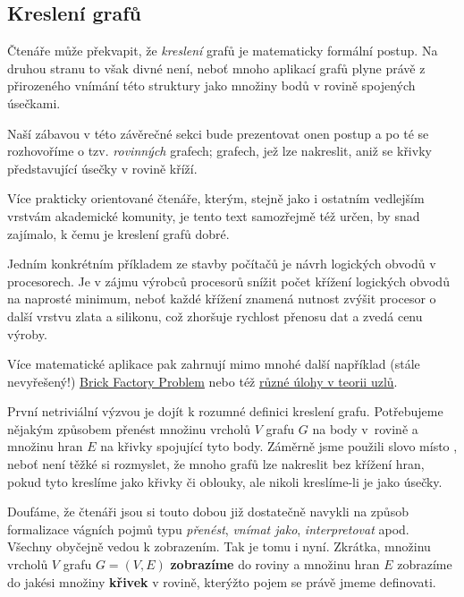 \subsection{Kreslení grafů}
\label{ssec:kresleni-grafu}

Čtenáře může překvapit, že \emph{kreslení} grafů je matematicky formální postup.
Na druhou stranu to však divné není, neboť mnoho aplikací grafů plyne právě z
přirozeného vnímání této struktury jako množiny bodů v rovině spojených
úsečkami.

Naší zábavou v této závěrečné sekci bude prezentovat onen postup a po té se
rozhovoříme o tzv. \emph{rovinných} grafech; grafech, jež lze nakreslit, aniž se
křivky představující úsečky v rovině kříží.

Více prakticky orientované čtenáře, kterým, stejně jako i ostatním vedlejším
vrstvám akademické komunity, je tento text samozřejmě též určen, by snad
zajímalo, k čemu je kreslení grafů dobré.

Jedním konkrétním příkladem ze stavby počítačů je návrh logických obvodů v
procesorech. Je v zájmu výrobců procesorů snížit počet křížení logických obvodů
na naprosté minimum, neboť každé křížení znamená nutnost zvýšit procesor o další
vrstvu zlata a silikonu, což zhoršuje rychlost přenosu dat a zvedá cenu výroby.

Více matematické aplikace pak zahrnují mimo mnohé další například (stá\-le
nevyřešený!)
\href{https://en.wikipedia.org/wiki/Tur%C3%A1n%27s_brick_factory_problem}{Brick
Factory Problem} nebo též
\href{https://www.sciencedirect.com/science/article/abs/pii/S0252960212600472}{různé
úlohy v teorii uzlů}.

První netriviální výzvou je dojít k rozumné definici kreslení grafu. Potřebujeme
nějakým způsobem přenést množinu vrcholů $V$ grafu $G$ na body v~rovině a
množinu hran $E$ na křivky spojující tyto body. Záměrně jsme použili slovo
 místo , neboť není těžké si rozmyslet, že mnoho grafů lze
nakreslit bez křížení hran, pokud tyto kreslíme jako křivky či oblouky, ale
nikoli kreslíme-li je jako úsečky.

Doufáme, že čtenáři jsou si touto dobou již dostatečně navykli na způsob
formalizace vágních pojmů typu \emph{přenést}, \emph{vnímat jako},
\emph{interpretovat} apod. Všechny obyčejně vedou k zobrazením. Tak je tomu i
nyní. Zkrátka, množinu vrcholů $V$ grafu $G = (V,E)$ \textbf{zobrazíme} do
roviny a množinu hran $E$ zobrazíme do jakési množiny \textbf{křivek} v rovině,
kterýžto pojem se právě jmeme definovati.

